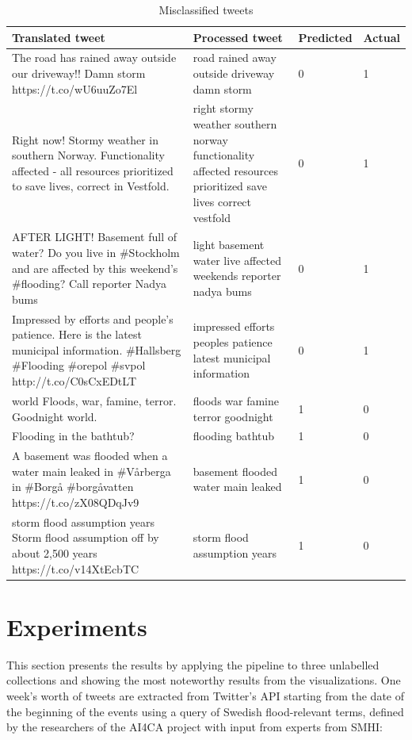 \begin{table}[ht!]
  \center
  \caption{Misclassified tweets}
  \begin{tabular}{|L{0.35\textwidth}|L{0.35\textwidth}|l|l|}
    \hline
    Translated tweet & Processed tweet & Predicted & Actual \\
    \hline
    The road has rained away outside our driveway!! Damn storm https://t.co/wU6uuZo7El &
    road rained away outside driveway damn storm & 0 & 1 \\
    \hline
    Right now! Stormy weather in southern Norway. Functionality affected - all resources prioritized to save lives, correct in Vestfold. &
    right stormy weather southern norway functionality affected resources prioritized save lives correct vestfold & 0 & 1\\
    \hline
    AFTER LIGHT! Basement full of water? Do you live in \#Stockholm and are affected by this weekend's
    \#flooding? Call reporter Nadya bums &
    light basement water live affected weekends reporter nadya bums & 0 & 1\\
    \hline
    Impressed by efforts and people's patience. Here is the latest municipal information. \#Hallsberg
    \#Flooding \#orepol \#svpol http://t.co/C0sCxEDtLT &
    impressed efforts peoples patience latest municipal information & 0 & 1 \\
    \hline
    world Floods, war, famine, terror. Goodnight world. & 
    floods war famine terror goodnight & 1 & 0 \\
    \hline
    Flooding in the bathtub? & 
    flooding bathtub & 1 & 0 \\
    \hline
    A basement was flooded when a water main leaked in \#Vårberga in \#Borgå \#borgåvatten https://t.co/zX08QDqJv9 & 
    basement flooded water main leaked & 1 & 0 \\
    \hline
    storm flood assumption years Storm flood assumption off by about 2,500 years https://t.co/v14XtEcbTC & 
    storm flood assumption years & 1 & 0 \\
    \hline
  \end{tabular}
  \label{tab:tweets_missclassified}
\end{table}


\section{Experiments}%
\label{sec:Experiments}

This section presents the results by applying the pipeline to three unlabelled collections and
showing the most noteworthy results from the visualizations. One week's worth of tweets are
extracted from Twitter's \ac{API} starting from the date of the beginning of the events using a query of
Swedish flood-relevant terms, defined by the researchers of the AI4CA project with input from
experts from SMHI:

